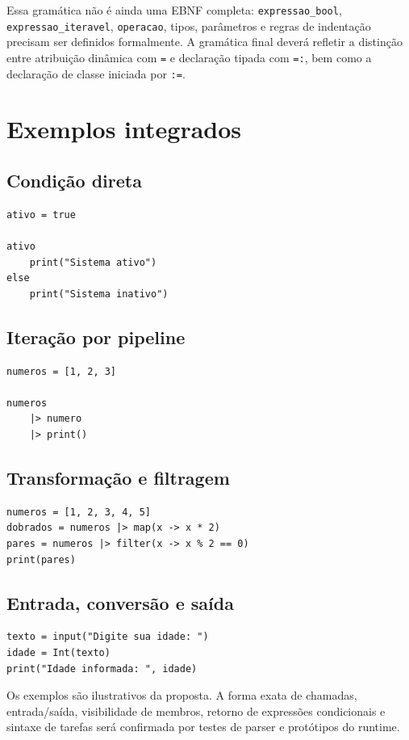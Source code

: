 \documentclass[12pt,a4paper]{article}
\begin{document}
Essa gramática não é ainda uma EBNF completa: \texttt{expressao\_bool}, \texttt{expressao\_iteravel}, \texttt{operacao}, tipos, parâmetros e regras de indentação precisam ser definidos formalmente. A gramática final deverá refletir a distinção entre atribuição dinâmica com \texttt{=} e declaração tipada com \texttt{=:}, bem como a declaração de classe iniciada por \texttt{:=}.

\section{Exemplos integrados}
\subsection{Condição direta}
\begin{lstlisting}
ativo = true

ativo
    print("Sistema ativo")
else
    print("Sistema inativo")
\end{lstlisting}

\subsection{Iteração por pipeline}
\begin{lstlisting}
numeros = [1, 2, 3]

numeros
    |> numero
    |> print()
\end{lstlisting}

\subsection{Transformação e filtragem}
\begin{lstlisting}
numeros = [1, 2, 3, 4, 5]
dobrados = numeros |> map(x -> x * 2)
pares = numeros |> filter(x -> x % 2 == 0)
print(pares)
\end{lstlisting}

\subsection{Entrada, conversão e saída}
\begin{lstlisting}
texto = input("Digite sua idade: ")
idade = Int(texto)
print("Idade informada: ", idade)
\end{lstlisting}

Os exemplos são ilustrativos da proposta. A forma exata de chamadas, entrada/saída, visibilidade de membros, retorno de expressões condicionais e sintaxe de tarefas será confirmada por testes de parser e protótipos do runtime.
\end{document}
